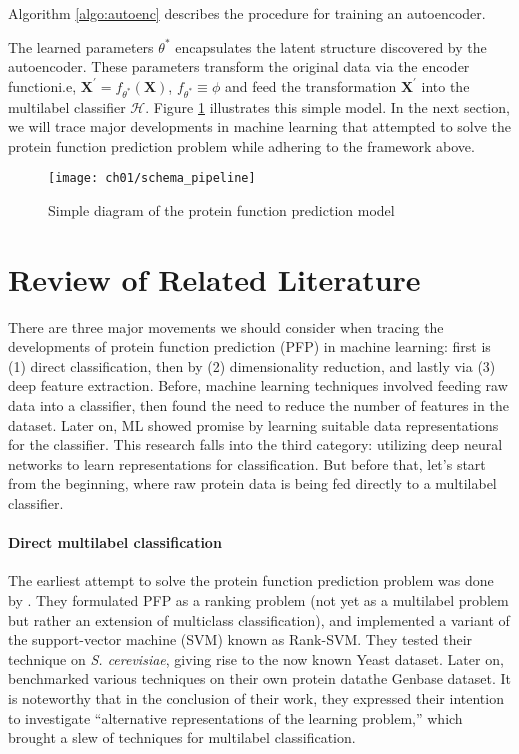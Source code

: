 Algorithm \ref{algo:autoenc} describes the procedure for training an autoencoder.



The learned parameters $\theta^{\ast}$ encapsulates the latent structure
discovered by the autoencoder. These parameters transform the original data
via the encoder function\textemdash i.e, $ \mathbf{X}^{\prime} =
f_{\theta^{\ast}}(\mathbf{X})$, $f_{\theta^{\ast}} \equiv \phi$\textemdash
and feed the transformation $\mathbf{X}^{\prime}$ into the multilabel
classifier $\mathcal{H}$. Figure \ref{schema:pipeline} illustrates this
simple model. In the next section, we will trace major developments in
machine learning that attempted to solve the protein function prediction
problem while adhering to the framework above.


\begin{figure}[!t]
  \centering
  \texttt{[image: ch01/schema\_pipeline]}
  \caption{Simple diagram of the protein function prediction model}
  \label{schema:pipeline}
\end{figure}

\section{Review of Related Literature}
\label{LiteratureReview}

\par There are three major movements we should consider when tracing the
developments of protein function prediction (PFP) in machine learning: first is
(1) direct classification, then by (2) dimensionality reduction, and lastly via
(3) deep feature extraction. Before, machine learning techniques involved
feeding raw data into a classifier, then found the need to reduce the number of
features in the dataset. Later on, ML showed promise by learning suitable data
representations for the classifier. This research falls into the third
category: utilizing deep neural networks to learn representations for
classification. But before that, let's start from the beginning, where raw
protein data is being fed directly to a multilabel classifier.

\paragraph{Direct multilabel classification}
The earliest attempt to solve the protein function prediction problem was
done by \cite{elisseeff2001kernel}. They formulated PFP as a ranking problem
(not yet as a multilabel problem but rather an extension of multiclass
classification), and implemented a variant of the support-vector machine
(SVM) known as Rank-SVM. They tested their technique on \textit{S.
cerevisiae}, giving rise to the now known Yeast dataset. Later on,
\cite{diplaris2005protein} benchmarked various techniques on their own
protein data\textemdash the Genbase dataset. It is noteworthy that in the
conclusion of their work, they expressed their intention to investigate
``alternative representations of the learning problem,'' which brought a slew
of techniques for multilabel classification.

